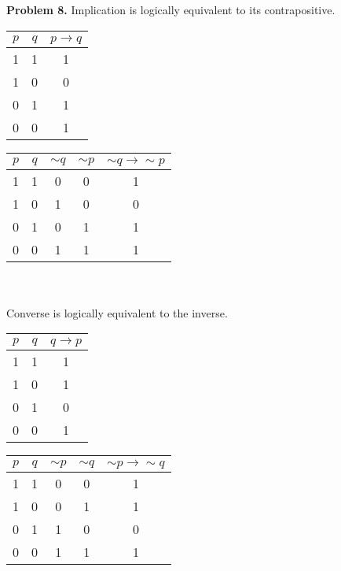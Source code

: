 \documentclass[a4paper,12pt]{article}
\newenvironment{problem}[1]{\par\bigskip\noindent\textbf{Problem #1.} \newline}{}
\begin{document}
  \begin{problem}{8}
    Implication is logically equivalent to its contrapositive. \\
    \begin{tabular}{|c|c|c|}
      \hline          
      $p$ & $q$ & $p \rightarrow q$\\
      \hline  
      1&1&1\\
      \hline  
      1&0&0\\
      \hline
      0&1&1\\
      \hline
      0&0&1\\
      \hline
    \end{tabular}
    \begin{tabular}{|c|c|c|c|c|}
      \hline          
      $p$ & $q$ & $\sim q$ & $\sim p$ & $\sim q \rightarrow \sim p$\\
      \hline  
      1&1&0&0&1\\
      \hline  
      1&0&1&0&0\\
      \hline
      0&1&0&1&1\\
      \hline
      0&0&1&1&1\\
      \hline
    \end{tabular}\\\\
    Converse is logically equivalent to the inverse. \\
    \begin{tabular}{|c|c|c|}
      \hline          
      $p$ & $q$ & $q \rightarrow p$\\
      \hline  
      1&1&1\\
      \hline  
      1&0&1\\
      \hline
      0&1&0\\
      \hline
      0&0&1\\
      \hline
    \end{tabular}
    \begin{tabular}{|c|c|c|c|c|}
      \hline          
      $p$ & $q$ & $\sim p$ & $\sim q$ & $\sim p \rightarrow \sim q$\\
      \hline  
      1&1&0&0&1\\
      \hline  
      1&0&0&1&1\\
      \hline
      0&1&1&0&0\\
      \hline
      0&0&1&1&1\\
      \hline
    \end{tabular}\\\\
  \end{problem}
\end{document}
